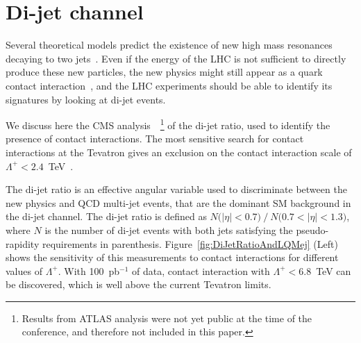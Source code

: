 \documentclass{cimento}
\begin{document}
\section{Di-jet channel} \label{dijet}
Several theoretical models predict the existence of new 
high mass resonances decaying to two 
jets~\cite{Baur:1989kv,Bagger:1987fz,Angelopoulos:1986uq}.
Even if the energy of the LHC is not sufficient to directly produce 
these new particles, the new physics might still appear as 
a quark contact interaction~\cite{Eichten:1983hw}, 
and the LHC experiments should 
be able to identify its signatures by looking at di-jet events.

We discuss here the CMS analysis~\cite{DIJETSNOTE}~\footnote{Results 
from ATLAS analysis were not yet public at the time 
of the conference, and therefore not included in this paper.}
of the di-jet ratio, used to identify the presence of contact interactions. 
The most sensitive search for contact interactions at the Tevatron 
gives an exclusion on the contact interaction scale 
of $\Lambda^{+} < 2.4$~TeV~\cite{Abbott:1998wh}.  

The di-jet ratio is an effective angular variable used to 
discriminate between the new physics and QCD multi-jet events, 
that are the dominant SM background in the di-jet channel. The di-jet ratio is 
defined as $N\mbox{(}|\eta|<0.7\mbox{)}~/~N\mbox{(}0.7<|\eta|< 1.3 \mbox{)}$, 
where $N$ is the number of di-jet events with both jets satisfying the 
pseudo-rapidity requirements in parenthesis. 
Figure~\ref{fig:DiJetRatioAndLQMej} (Left) shows the sensitivity of this 
measurements to contact interactions for different values of $\Lambda^{+}$. 
With 100~pb$^{-1}$ of data, contact interaction with
$\Lambda^{+} < 6.8$~TeV can be discovered, which is well above the 
current Tevatron limits.
 
\end{document}
